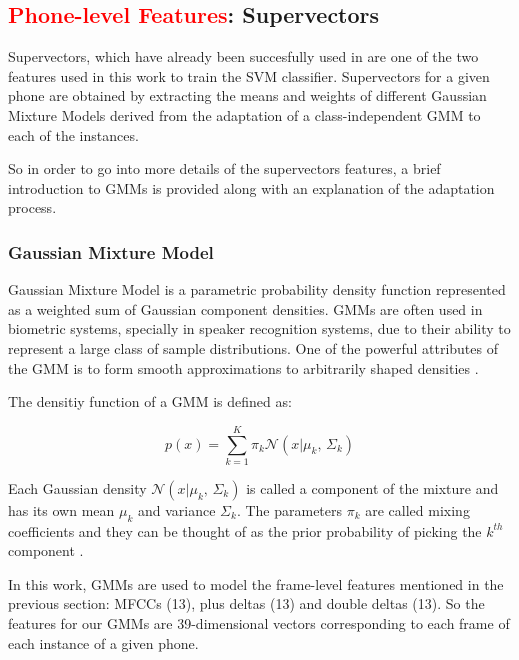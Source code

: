 \subsection{\textcolor{red}{Phone-level Features}: Supervectors}

Supervectors, which have already been succesfully used in
\cite{supervectors, main} are one of the two features used in this work to train the SVM
classifier. Supervectors for a given phone are obtained by extracting the means and weights
of different
Gaussian Mixture Models derived from the adaptation of a class-independent GMM
to each of the instances.

So in order to go into more details of the supervectors features, a brief introduction to
GMMs is provided along with an explanation of the adaptation process.

\subsubsection{Gaussian Mixture Model} \label{subsection:gmm}

Gaussian Mixture Model is a parametric probability density function represented as a weighted
sum of Gaussian component densities. GMMs are often used in biometric systems, specially
in speaker recognition systems, due to their ability to represent a large class of sample
distributions. One of the powerful attributes of the GMM is to form smooth approximations to
arbitrarily shaped densities \cite{gmm_reynolds}.

The densitiy function of a GMM is defined as:

\begin{equation}
  p(x) = \sum_{k=1}^{K}\pi_{k} \mathcal{N}(x|\mu_{k},\,\Sigma_{k})
\end{equation}

Each Gaussian density $\mathcal{N}(x|\mu_{k},\,\Sigma_{k})$ is called a component of the mixture
and has its own mean $\mu_{k}$ and variance $\Sigma_{k}$. The parameters $\pi_{k}$ are called
mixing coefficients and they can be thought of as the prior probability of picking the $k^{th}$
component \cite{gmm_bishop}.

In this work, GMMs are used to model the frame-level features mentioned in the previous section:
MFCCs (13), plus deltas (13) and double deltas (13). So the features for our GMMs are
39-dimensional vectors corresponding to each frame of each instance of a given phone.


